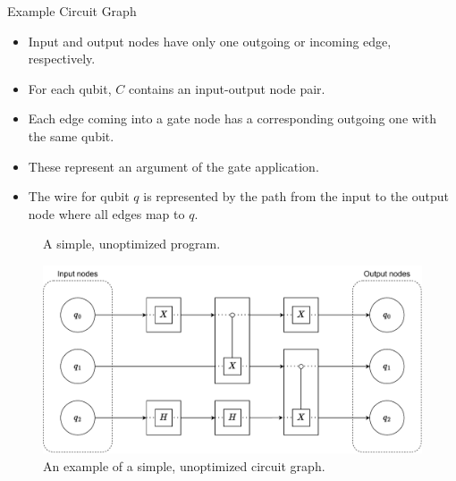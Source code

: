 \begin{frame}{Example Circuit Graph}
    \begin{itemize}
        \item Input and output nodes have only one outgoing or incoming edge, respectively. 
        \item For each qubit, $C$ contains an input-output node pair.
        \item Each edge coming into a gate node has a corresponding outgoing one with the same qubit.
        \item These represent an argument of the gate application.
        \item The wire for qubit $q$ is represented by the path from the input to the output node where all edges map to $q$.
    \end{itemize}
    \vfill
    \begin{minipage}{.35\textwidth}
        \begin{figure}
            \centering
            
            \caption{A simple, unoptimized program.}
        \end{figure}
    \end{minipage}
    \begin{minipage}{.60\textwidth}
        \begin{figure}[htp]
            \centering     
            \includegraphics[width=.9\textwidth]{../figures/drawio/circuit_graph_unoptimized.pdf}
            \caption{An example of a simple, unoptimized circuit graph.}
        \end{figure}
    \end{minipage}
\end{frame}

